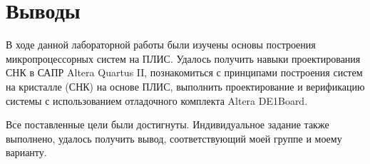 \section*{Выводы}
В ходе данной лабораторной работы были изучены основы построения микропроцессорных систем на ПЛИС.
Удалось получить навыки проектирования СНК в САПР Altera Quartus II, познакомиться с принципами построения систем на кристалле (СНК) на основе ПЛИС,
выполнить проектирование и верификацию системы с использованием отладочного комплекта Altera DE1Board.

Все поставленные цели были достигнуты. Индивидуальное задание также выполнено, удалось получить вывод, соответствующий
моей группе и моему варианту.
